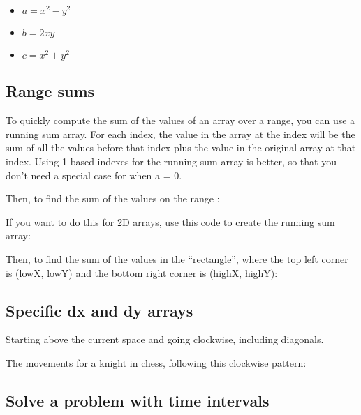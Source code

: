 \begin{itemize}
    \item $a = x^2 - y^2$
    \item $b = 2xy$
    \item $c = x^2 + y^2$
\end{itemize}

\subsection*{Range sums}

To quickly compute the sum of the values of an array over a range, you can use a running sum array. For each index, the value in the array at the index will be the sum of all the values before that index plus the value in the original array at that index. Using 1-based indexes for the running sum array is better, so that you don’t need a special case for when a = 0.



Then, to find the sum of the values on the range \inline{[a, b]}:



If you want to do this for 2D arrays, use this code to create the running sum array:



Then, to find the sum of the values in the “rectangle”, where the top left corner is (lowX, lowY) and the bottom right corner is (highX, highY):



\subsection*{Specific dx and dy arrays}

Starting above the current space and going clockwise, including diagonals.



The movements for a knight in chess, following this clockwise pattern:



\subsection*{Solve a problem with time intervals}

